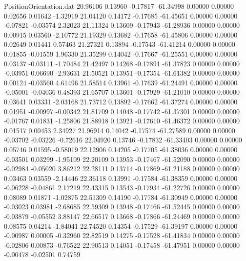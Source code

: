\begin{filecontents}{PositionOrientation.dat}
  20.96106    0.13960   -0.17817   -61.34998    0.00000    0.00000    0.02656    0.01642   -1.32919
  21.04120    0.14172   -0.17685   -61.45651    0.00000    0.00000   -0.07821   -0.03574    2.32023
  21.11324    0.13609   -0.17943   -61.28936    0.00000    0.00000    0.00915    0.03560   -2.10772
  21.19329    0.13682   -0.17658   -61.45806    0.00000    0.00000    0.02649    0.01441    0.57463
  21.27321    0.13894   -0.17543   -61.41214    0.00000    0.00000    0.01855   -0.01559    1.96330
  21.35299    0.14042   -0.17667   -61.25551    0.00000    0.00000    0.03137   -0.03111   -1.70484
  21.42497    0.14268   -0.17891   -61.37823    0.00000    0.00000   -0.03951    0.06690   -2.93631
  21.50521    0.13951   -0.17354   -61.61382    0.00000    0.00000    0.00124   -0.03560    4.61496
  21.58514    0.13961   -0.17639   -61.24491    0.00000    0.00000   -0.05001   -0.04036    0.48393
  21.65707    0.13601   -0.17929   -61.21010    0.00000    0.00000    0.03641    0.03331   -2.03168
  21.73712    0.13892   -0.17662   -61.37274    0.00000    0.00000    0.01951   -0.00997   -0.00342
  21.81709    0.14048   -0.17742   -61.37301    0.00000    0.00000   -0.01767    0.01831   -1.25806
  21.88918    0.13921   -0.17610   -61.46372    0.00000    0.00000    0.01517    0.00453    2.34927
  21.96914    0.14042   -0.17574   -61.27589    0.00000    0.00000   -0.03702   -0.03226   -0.72616
  22.04920    0.13746   -0.17832   -61.33403    0.00000    0.00000    0.05746    0.01595   -0.58019
  22.12906    0.14205   -0.17705   -61.38036    0.00000    0.00000   -0.03501    0.03299   -1.95109
  22.20109    0.13953   -0.17467   -61.52090    0.00000    0.00000   -0.02984   -0.05020    3.86212
  22.28111    0.13714   -0.17869   -61.21188    0.00000    0.00000    0.03463    0.03559   -2.14446
  22.36118    0.13991   -0.17584   -61.38359    0.00000    0.00000   -0.06228   -0.04861    2.17219
  22.43315    0.13543   -0.17934   -61.22726    0.00000    0.00000    0.08089    0.01871   -1.02875
  22.51309    0.14190   -0.17784   -61.30949    0.00000    0.00000   -0.03023    0.03981   -2.68685
  22.59309    0.13948   -0.17466   -61.52445    0.00000    0.00000   -0.03879   -0.05552    3.88147
  22.66517    0.13668   -0.17866   -61.24469    0.00000    0.00000    0.08575    0.04214   -1.84041
  22.74520    0.14354   -0.17529   -61.39197    0.00000    0.00000   -0.00987    0.00005   -0.32960
  22.82519    0.14275   -0.17528   -61.41834    0.00000    0.00000   -0.02806    0.00873   -0.76522
  22.90513    0.14051   -0.17458   -61.47951    0.00000    0.00000   -0.00478   -0.02501    0.74759

\end{filecontents}

